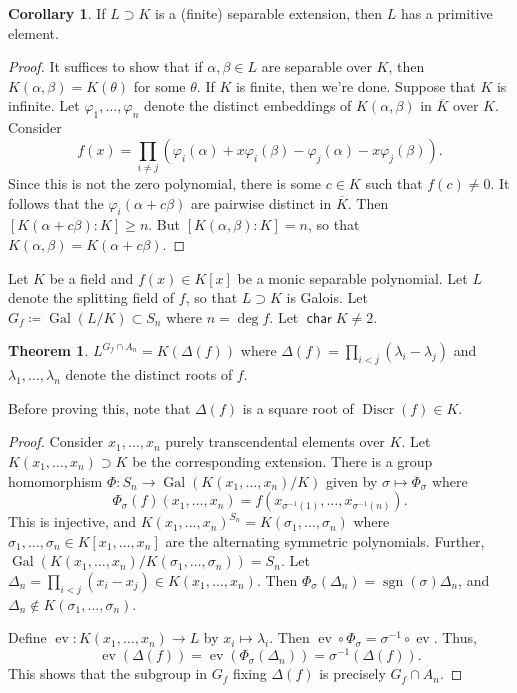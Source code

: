 \documentclass[10pt,letterpaper,cm]{nupset}
\theoremstyle{definition}
\theoremstyle{theorem}
\newtheorem{theorem}[definition]{Theorem}
\newtheorem{corollary}[definition]{Corollary}
\theoremstyle{remark}
\newcommand{\1}{\mathbf{1}}
\newcommand{\0}{\vec 0}
\DeclareMathOperator{\Char}{\mathsf{char}}
\DeclareMathOperator{\gal}{Gal}
\DeclareMathOperator{\ev}{ev}
\DeclareMathOperator{\sgn}{sgn}
\DeclareMathOperator{\disc}{Discr}
\begin{document}
\begin{corollary}
If $L \supset K$ is a (finite) separable extension, then $L$ has a primitive element. 
\end{corollary}
\begin{proof}
It suffices to show that if $\alpha, \beta \in L$ are separable over $K$, then $K(\alpha, \beta) = K(\theta)$ for some $\theta$. If $K$ is finite, then we're done. Suppose that $K$ is infinite. Let $\varphi_1, \ldots, \varphi_n$ denote the distinct embeddings of $K(\alpha, \beta)$ in $\overline{K}$ over $K$. Consider $$ f(x) = \prod_{i \ne j} (\varphi_i(\alpha) + x \varphi_i(\beta) - \varphi_j(\alpha) - x \varphi_j(\beta))   .$$ Since this is not the zero polynomial, there is some $c\in K$ such that $f(c) \ne 0$. It follows that the $\varphi_i(\alpha + c \beta)$ are pairwise distinct in $\overline{K}$. Then $[K(\alpha + c \beta) : K] \geq n$. But $[K(\alpha, \beta) : K] = n$, so that $K(\alpha, \beta) = K(\alpha + c \beta)$. 
\end{proof}

\smallskip

 Let $K$ be a field and $f(x) \in K[x]$ be a monic separable polynomial. Let $L$ denote the splitting field of $f$, so that $L \supset K$ is Galois. Let $G_f \coloneqq  \gal(L/K) \subset S_n$ where $n = \deg{f}$. Let $\Char{K} \ne 2$.
 
\begin{theorem}
 $L^{G_f \cap A_n} = K(\Delta(f))$ where $\Delta(f) = \prod_{i < j}(\lambda_i - \lambda_j)$ and $\lambda_1, \ldots, \lambda_n$ denote the distinct roots of $f$.
\end{theorem}
Before proving this, note that $\Delta(f)$ is a square root of $\disc(f) \in K$. 
\begin{proof}
Consider $x_1, \ldots, x_n$ purely transcendental elements over $K$. Let $K(x_1, \ldots, x_n) \supset K$ be the corresponding extension. There is a group homomorphism $\Phi : S_n \to \gal(K(x_1, \ldots, x_n)/K)$ given by $\sigma \mapsto \Phi_{\sigma}$ where $$\Phi_{\sigma}(f)(x_1, \ldots, x_n) = f(x_{\sigma^{-1}(1)}, \ldots, x_{\sigma^{-1}(n)}).$$ This is injective, and $K(x_1, \ldots, x_n)^{S_n} = K(\sigma_1, \ldots, \sigma_n)$ where $\sigma_1, \ldots, \sigma_n \in K[x_1, \ldots, x_n]$ are the alternating symmetric polynomials. Further, $\gal(K(x_1, \ldots, x_n)/K(\sigma_1, \ldots, \sigma_n)) = S_n$. Let $\Delta_n = \prod_{i <j}(x_i - x_j) \in K(x_1, \ldots, x_n)$. Then $\Phi_{\sigma}(\Delta_n) = \sgn(\sigma)\Delta_n$, and $\Delta_n \notin K(\sigma_1, \ldots, \sigma_n)$. 

\medskip

 Define $\ev : K(x_1, \ldots, x_n) \to L$ by $x_i \mapsto \lambda_i$. Then $\ev \circ \Phi_{\sigma} = \sigma^{-1} \circ \ev$. Thus, $$\ev(\Delta(f)) = \ev(\Phi_{\sigma}(\Delta_n)) = \sigma^{-1}(\Delta(f)).$$ This shows that the subgroup in $G_f$ fixing $\Delta(f)$ is precisely $G_f \cap A_n$. 
\end{proof}
\end{document}
